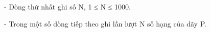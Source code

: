 -       Dòng thứ nhất ghi số N, 1 ≤ N ≤ 1000.  

   -       Trong một số dòng tiếp theo ghi lần lượt N số hạng của dãy P.  



\